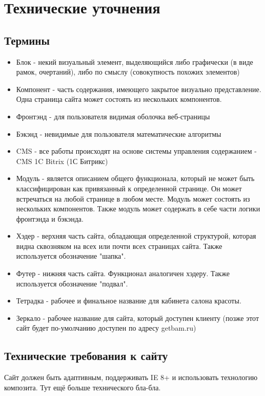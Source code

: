 \documentclass[DIV=calc, paper=a4, fontsize=11pt]{scrartcl} %
\begin{document}
\section{Технические уточнения}

\subsection{Термины}

        \begin{itemize}
        \item Блок - некий визуальный элемент, выделяющийся либо графически (в виде рамок, очертаний), либо по смыслу (совокупность похожих элементов)
        \item Компонент - часть содержания, имеющего закрытое визуально представление. Одна страница сайта может состоять из нескольких компонентов.
        \item Фронтэнд - для пользователя видимая оболочка веб-страницы
        \item Бэкэнд - невидимые для пользователя математические алгоритмы
        \item CMS - все работы происходят на основе системы управления содержанием - CMS 1C Bitrix (1С Битрикс)
        \item Модуль - является описанием общего функционала, который не может быть классифицирован как привязанный к определенной странице. Он может встречаться на любой странице в любом месте. Модуль может состоять из нескольких компонентов. Также модуль может содержать в себе части логики фронтэнда и бэкэнда.
        \item Хэдер - верхняя часть сайта, обладающая определенной структурой, которая видна сквозняком на всех или почти всех страницах сайта. Также используется обозначение "шапка".
        \item Футер - нижняя часть сайта. Функционал аналогичен хэдеру. Также используется обозначение "подвал".
        \item Тетрадка - рабочее и финальное название для кабинета салона красоты.
        \item Зеркало - рабочее название для сайта, который доступен клиенту (позже этот сайт будет по-умолчанию доступен по адресу getbam.ru)
    \end{itemize}


\subsection{Технические требования к сайту}
Сайт должен быть адаптивным, поддерживать IE 8+ и использовать технологию композита.
Тут ещё больше технического бла-бла.
\end{document}
